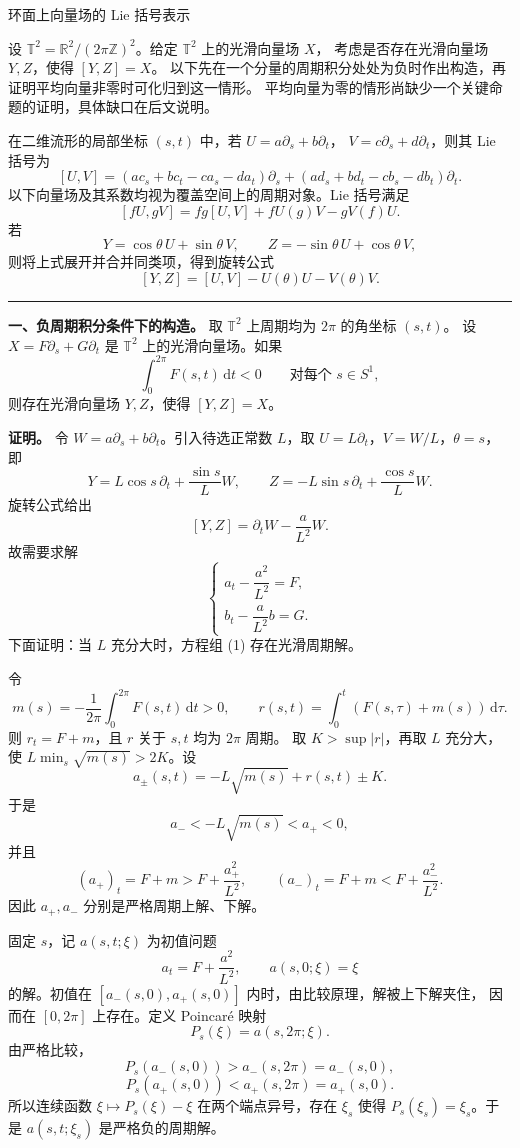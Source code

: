 \documentclass[11pt,a4paper]{ctexart}
\newcommand{\R}{\mathbb R}
\newcommand{\T}{\mathbb T}
\newcommand{\dd}{\,\mathrm d}
\newcommand{\sep}{\par\vspace{5pt}\noindent\rule{\linewidth}{0.7pt}\par\vspace{5pt}}
\begin{document}
\begin{center}\Large 环面上向量场的 Lie 括号表示\end{center}
设 $\T^2=\R^2/(2\pi\mathbb Z)^2$。给定 $\T^2$ 上的光滑向量场 $X$，
考虑是否存在光滑向量场 $Y,Z$，使得 $[Y,Z]=X$。
以下先在一个分量的周期积分处处为负时作出构造，再证明平均向量非零时可化归到这一情形。
平均向量为零的情形尚缺少一个关键命题的证明，具体缺口在后文说明。


在二维流形的局部坐标 $(s,t)$ 中，若 $U=a\partial_s+b\partial_t$，
$V=c\partial_s+d\partial_t$，则其 Lie 括号为
\[[U,V]=(ac_s+bc_t-ca_s-da_t)\partial_s
+(ad_s+bd_t-cb_s-db_t)\partial_t.\]
以下向量场及其系数均视为覆盖空间上的周期对象。Lie 括号满足
\[[fU,gV]=fg[U,V]+fU(g)V-gV(f)U.\]
若
\[Y=\cos\theta\,U+\sin\theta\,V,\qquad
Z=-\sin\theta\,U+\cos\theta\,V,\]
则将上式展开并合并同类项，得到旋转公式
\[[Y,Z]=[U,V]-U(\theta)U-V(\theta)V.\]
\sep
\textbf{一、负周期积分条件下的构造。}
取 $\T^2$ 上周期均为 $2\pi$ 的角坐标 $(s,t)$。
设 $X=F\partial_s+G\partial_t$ 是 $\T^2$ 上的光滑向量场。如果
\[\int_0^{2\pi}F(s,t)\dd t<0\qquad\text{对每个 }s\in S^1,\]
则存在光滑向量场 $Y,Z$，使得 $[Y,Z]=X$。


\textbf{证明。} 令 $W=a\partial_s+b\partial_t$。引入待选正常数 $L$，取 $U=L\partial_t$，$V=W/L$，$\theta=s$，即
\[Y=L\cos s\,\partial_t+\frac{\sin s}{L}W,\qquad
Z=-L\sin s\,\partial_t+\frac{\cos s}{L}W.\]
旋转公式给出
\[[Y,Z]=\partial_tW-\frac{a}{L^2}W.\]
故需要求解
\[\tag{1}\begin{cases}a_t-\dfrac{a^2}{L^2}=F,\\[3pt]
b_t-\dfrac{a}{L^2}b=G.\end{cases}\]
下面证明：当 $L$ 充分大时，方程组 (1) 存在光滑周期解。

令
\[m(s)=-\frac1{2\pi}\int_0^{2\pi}F(s,t)\dd t>0,\qquad
r(s,t)=\int_0^t(F(s,\tau)+m(s))\dd\tau.\]
则 $r_t=F+m$，且 $r$ 关于 $s,t$ 均为 $2\pi$ 周期。
取 $K>\sup|r|$，再取 $L$ 充分大，使 $L\min_s\sqrt{m(s)}>2K$。设
\[a_\pm(s,t)=-L\sqrt{m(s)}+r(s,t)\pm K.\]
于是
\[a_-<-L\sqrt{m(s)}<a_+<0,\]
并且
\[(a_+)_t=F+m>F+\frac{a_+^2}{L^2},\qquad
(a_-)_t=F+m<F+\frac{a_-^2}{L^2}.\]
因此 $a_+,a_-$ 分别是严格周期上解、下解。

固定 $s$，记 $a(s,t;\xi)$ 为初值问题
\[a_t=F+\frac{a^2}{L^2},\qquad a(s,0;\xi)=\xi\]
的解。初值在 $[a_-(s,0),a_+(s,0)]$ 内时，由比较原理，解被上下解夹住，
因而在 $[0,2\pi]$ 上存在。定义 Poincar\'e 映射
\[P_s(\xi)=a(s,2\pi;\xi).\]
由严格比较，
\[P_s(a_-(s,0))>a_-(s,2\pi)=a_-(s,0),\]
\[P_s(a_+(s,0))<a_+(s,2\pi)=a_+(s,0).\]
所以连续函数 $\xi\mapsto P_s(\xi)-\xi$ 在两个端点异号，存在
$\xi_s$ 使得 $P_s(\xi_s)=\xi_s$。于是 $a(s,t;\xi_s)$ 是严格负的周期解。
\end{document}
